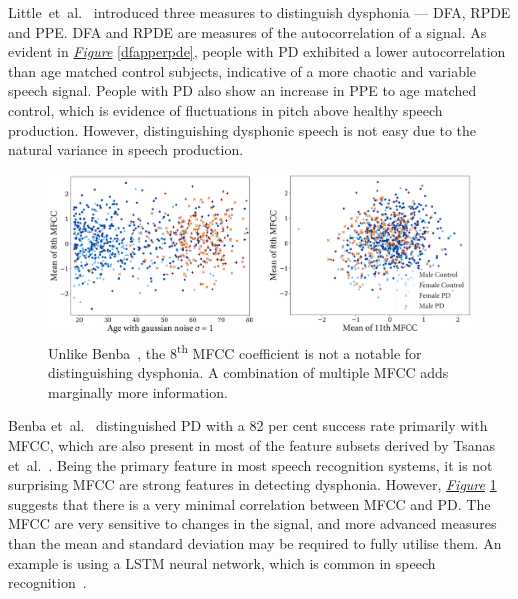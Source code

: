 \documentclass[12pt, twoside]{book}
\begin{document}
Little~et~al.~\cite{splittlenonlinear2007,splittledysphonia2009} introduced three measures to distinguish dysphonia --- DFA, RPDE and PPE. DFA and RPDE are measures of the autocorrelation of a signal. As evident in \textit{\hyperref[dfapperpde]{Figure}} \ref{dfapperpde}, people with PD exhibited a lower autocorrelation than age matched control subjects, indicative of a more chaotic and variable speech signal. People with PD also show an increase in PPE to age matched control, which is evidence of fluctuations in pitch above healthy speech production. However, distinguishing dysphonic speech is not easy due to the natural variance in speech production.


\begin{figure}[!htb]
	\centering\includegraphics[width=1\linewidth]{mfcc_feat.png}
	\caption{Unlike Benba~\cite{benba2014mfcc}, the 8\textsuperscript{th} MFCC coefficient is not a notable for distinguishing dysphonia. A combination of multiple MFCC adds marginally more information. }
	\label{mfcc_feat}
	\vspace{-0.5em}
\end{figure}

Benba et~al.~\cite{benba2014mfcc} distinguished PD with a 82 per cent success rate primarily with MFCC, which are also present in most of the feature subsets derived by Tsanas et~al.~\cite{tsanas2012novel}. Being the primary feature in most speech recognition systems, it is not surprising MFCC are strong features in detecting dysphonia. However, \textit{\hyperref[mfcc_feat]{Figure}} \ref{mfcc_feat} suggests that there is a very minimal correlation between MFCC and PD. The MFCC are very sensitive to changes in the signal, and more advanced measures than the mean and standard deviation may be required to fully utilise them. An example is using a LSTM neural network, which is common in speech recognition~\cite{convlstm}.
\end{document}
